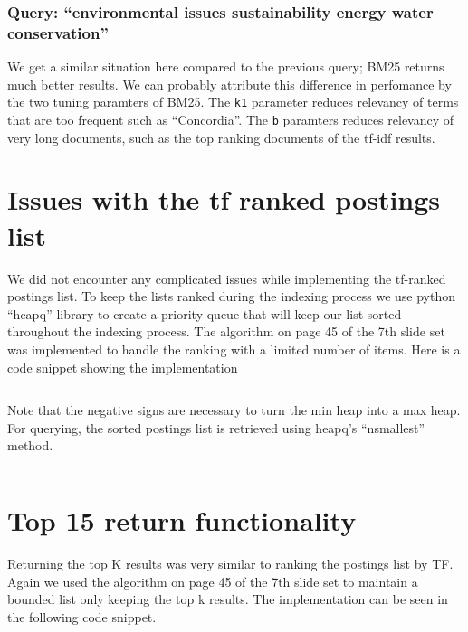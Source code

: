 \documentclass[]{article}
\begin{document}
\subsubsection{Query: ``environmental issues sustainability energy water conservation''}
We get a similar situation here compared to the previous query; BM25 returns much better results. We can probably attribute this difference in perfomance by the two tuning paramters of BM25. The \texttt{k1} parameter reduces relevancy of terms that are too frequent such as ``Concordia''. The \texttt{b} paramters reduces relevancy of very long documents, such as the top ranking documents of the  tf-idf results.


\newpage
\section{Issues with the tf ranked postings list}
We did not encounter any complicated issues while implementing the tf-ranked postings list. To keep the lists ranked during the indexing process we use python ``heapq'' library to create a priority queue that will keep our list sorted throughout the indexing process. The algorithm on page 45 of the 7th slide set was implemented to handle the ranking with a limited number of items. Here is a code snippet showing the implementation

\inputminted[]{python}{snip/tfranked.py}

Note that the negative signs are necessary to turn the min heap into a max heap. For querying, the sorted postings list is retrieved using heapq's ``nsmallest'' method. 

\inputminted[]{python}{snip/tfretrieve.py}

\newpage
\section{Top 15 return functionality}
Returning the top K results was very similar to ranking the postings list by TF. Again we used the algorithm on page 45 of the 7th slide set to maintain a bounded list only keeping the top k results. The implementation can be seen in the following code snippet.
 
\end{document}
